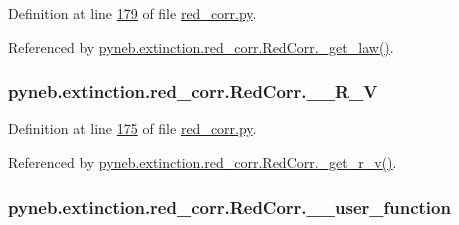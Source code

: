 \begin{DoxyVerb}
Definition at line \hyperlink{red__corr_8py_source_l00179}{179} of file \hyperlink{red__corr_8py_source}{red\-\_\-corr.\-py}.



Referenced by \hyperlink{red__corr_8py_source_l00150}{pyneb.\-extinction.\-red\-\_\-corr.\-Red\-Corr.\-\_\-get\-\_\-law()}.

\hypertarget{classpyneb_1_1extinction_1_1red__corr_1_1_red_corr_a93f7e44201375bc6e05a20c092b6a1d6}{
\subsubsection[{\-\_\-\-\_\-\-R\-\_\-\-V}]{\setlength{\rightskip}{0pt plus 5cm}pyneb.\-extinction.\-red\-\_\-corr.\-Red\-Corr.\-\_\-\-\_\-\-R\-\_\-\-V\hspace{0.3cm}{\ttfamily [private]}}}\label{classpyneb_1_1extinction_1_1red__corr_1_1_red_corr_a93f7e44201375bc6e05a20c092b6a1d6}


Definition at line \hyperlink{red__corr_8py_source_l00175}{175} of file \hyperlink{red__corr_8py_source}{red\-\_\-corr.\-py}.



Referenced by \hyperlink{red__corr_8py_source_l00148}{pyneb.\-extinction.\-red\-\_\-corr.\-Red\-Corr.\-\_\-get\-\_\-r\-\_\-v()}.

\hypertarget{classpyneb_1_1extinction_1_1red__corr_1_1_red_corr_aaf6e0eb6732be82bc65b02c36a2429c2}{
\subsubsection[{\-\_\-\-\_\-user\-\_\-function}]{\setlength{\rightskip}{0pt plus 5cm}pyneb.\-extinction.\-red\-\_\-corr.\-Red\-Corr.\-\_\-\-\_\-user\-\_\-function\hspace{0.3cm}{\ttfamily [private]}}}\label{classpyneb_1_1extinction_1_1red__corr_1_1_red_corr_aaf6e0eb6732be82bc65b02c36a2429c2}



\end{DoxyVerb}
